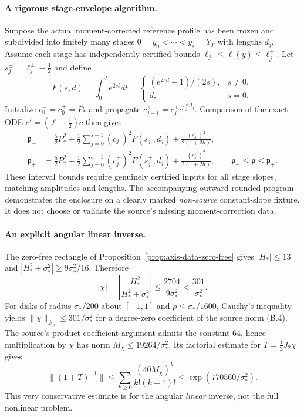 \paragraph{A rigorous stage-envelope algorithm.}
Suppose the actual moment-corrected reference profile has been
frozen and subdivided into finitely many stages
$0=y_0<\cdots<y_s=Y_T$ with lengths $d_j$.
Assume each stage has independently certified bounds
$\ell_j^-\le\ell(y)\le\ell_j^+$.
Let $s_j^\pm=\ell_j^\pm-\tfrac12$ and define
\[
F(s,d)=\int_0^d e^{2st}dt=
\begin{cases}(e^{2sd}-1)/(2s),&s\ne0,\\d,&s=0.\end{cases}
\]
Initialize $c_0^-=c_0^+=P_*$ and propagate
$c_{j+1}^\pm=c_j^\pm e^{s_j^\pm d_j}$.
Comparison of the exact ODE $c'=(\ell-\tfrac12)c$
then gives
\begin{equation}\label{eq:source-stage-enclosure}
\begin{split}
\mathfrak p_-&=\frac52P_*^2+
\frac12\sum_{j=0}^{s-1}(c_j^-)^2F(s_j^-,d_j)
+\frac{(c_s^-)^2}{2(1+2h)},\\
\mathfrak p_+&=\frac52P_*^2+
\frac12\sum_{j=0}^{s-1}(c_j^+)^2F(s_j^+,d_j)
+\frac{(c_s^+)^2}{2(1+2h)},\qquad
\mathfrak p_-\le\mathfrak p\le\mathfrak p_+.
\end{split}
\end{equation}
These interval bounds require genuinely certified inputs for all
stage slopes, matching amplitudes and lengths. The accompanying
outward-rounded program demonstrates the enclosure on a clearly
marked \emph{non-source} constant-slope fixture. It does not
choose or validate the source's missing moment-correction data.

\paragraph{An explicit angular linear inverse.}
The zero-free rectangle of Proposition~\ref{prop:axis-data-zero-free}
gives $|H_*|\le13$ and
$|H_*^2+\sigma_*^2|\ge9\sigma_*^2/16$. Therefore
\[
|\chi|=\left|\frac{H_*^2}{H_*^2+\sigma_*^2}\right|
\le\frac{2704}{9\sigma_*^2}<\frac{301}{\sigma_*^2}.
\]
For disks of radius $\sigma_*/200$ about $[-1,1]$ and
$\rho\le\sigma_*/1600$, Cauchy's inequality yields
$\|\chi\|_{\mathcal B_\rho}\le301/\sigma_*^2$
for a degree-zero coefficient of the source norm (B.4).
The source's product coefficient argument admits the constant
$64$, hence multiplication by $\chi$ has norm
$M_\chi\le19264/\sigma_*^2$.
Its factorial estimate for $T=\frac12J_2\chi$ gives
\begin{equation}\label{eq:source-explicit-linear-resolvent}
\|(1+T)^{-1}\|\le
\sum_{k\ge0}\frac{(40M_\chi)^k}{k!(k+1)!}
\le\exp(770560/\sigma_*^2).
\end{equation}
This very conservative estimate is for the angular
\emph{linear} inverse, not the full nonlinear problem.

